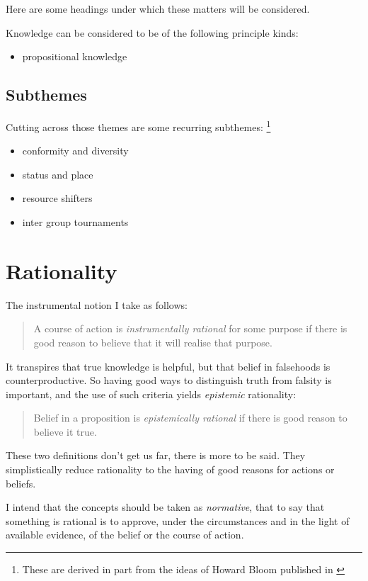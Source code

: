 \documentclass[10pt,titlepage]{book}
\begin{document}
Here are some headings under which these matters will be considered.

Knowledge can be considered to be of the following principle kinds:

\begin{itemize}
\item propositional knowledge
  \end{itemize}


\subsection{Subthemes}

Cutting across those themes are some recurring subthemes:
\footnote{These are derived in part from the ideas of Howard Bloom published in \cite{bloom-bs,bloomBRAIN}}

  \begin{itemize}
\item conformity and diversity
\item status and place
\item resource shifters
\item inter group tournaments
  \end{itemize}

  \section{Rationality}
  
The instrumental notion I take as follows:
\begin{quote}
  A course of action is \emph{instrumentally rational} for some purpose if there is good reason to believe that it will realise that purpose.
\end{quote}

It transpires that true knowledge is helpful, but that belief in falsehoods is counterproductive.
So having good ways to distinguish truth from falsity is important, and the use of such criteria yields \emph{epistemic} rationality:

\begin{quote}
Belief in a proposition is \emph{epistemically rational} if there is good reason to believe it true.
\end{quote}

These two definitions don't get us far, there is more to be said.
They simplistically reduce rationality to the having of good reasons for actions or beliefs.

I intend that the concepts should be taken as \emph{normative}, that to say that something is rational is to approve, under the circumstances and in the light of available evidence, of the belief or the course of action.
\end{document}
